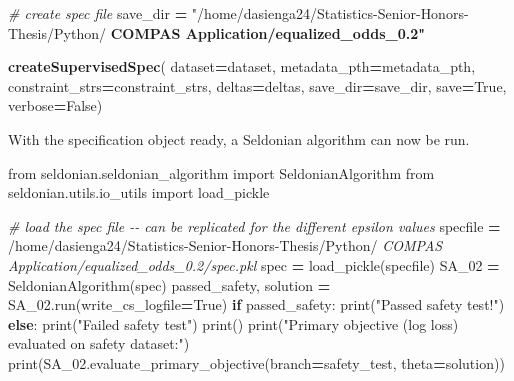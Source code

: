 \documentclass[12pt, twoside]{amherstthesis}
\newenvironment{Shaded}{\begin{snugshade}}{\end{snugshade}}
\newcommand{\BuiltInTok}[1]{#1}
\newcommand{\CommentTok}[1]{\textcolor[rgb]{0.56,0.35,0.01}{\textit{#1}}}
\newcommand{\ControlFlowTok}[1]{\textcolor[rgb]{0.13,0.29,0.53}{\textbf{#1}}}
\newcommand{\ErrorTok}[1]{\textcolor[rgb]{0.64,0.00,0.00}{\textbf{#1}}}
\newcommand{\ImportTok}[1]{#1}
\newcommand{\NormalTok}[1]{#1}
\newcommand{\OperatorTok}[1]{\textcolor[rgb]{0.81,0.36,0.00}{\textbf{#1}}}
\newcommand{\StringTok}[1]{\textcolor[rgb]{0.31,0.60,0.02}{#1}}
\newcommand{\VariableTok}[1]{\textcolor[rgb]{0.00,0.00,0.00}{#1}}
\begin{document}
\begin{Shaded}
\begin{Highlighting}[]
\CommentTok{\# create spec file}
\NormalTok{save\_dir }\OperatorTok{=} \StringTok{"/home/dasienga24/Statistics{-}Senior{-}Honors{-}Thesis/Python/\textquotesingle{}}
\ErrorTok{\textquotesingle{}COMPAS Application/equalized\_odds\_0.2"}

\ErrorTok{createSupervisedSpec}\NormalTok{(}
\NormalTok{            dataset}\OperatorTok{=}\NormalTok{dataset,}
\NormalTok{            metadata\_pth}\OperatorTok{=}\NormalTok{metadata\_pth,}
\NormalTok{            constraint\_strs}\OperatorTok{=}\NormalTok{constraint\_strs,}
\NormalTok{            deltas}\OperatorTok{=}\NormalTok{deltas,}
\NormalTok{            save\_dir}\OperatorTok{=}\NormalTok{save\_dir,}
\NormalTok{            save}\OperatorTok{=}\VariableTok{True}\NormalTok{,}
\NormalTok{            verbose}\OperatorTok{=}\VariableTok{False}\NormalTok{)}
\end{Highlighting}
\end{Shaded}
\noindent With the specification object ready, a Seldonian algorithm can now be run.
\begin{Shaded}
\begin{Highlighting}[]
\ImportTok{from}\NormalTok{ seldonian.seldonian\_algorithm }\ImportTok{import}\NormalTok{ SeldonianAlgorithm}
\ImportTok{from}\NormalTok{ seldonian.utils.io\_utils }\ImportTok{import}\NormalTok{ load\_pickle}

\CommentTok{\# load the spec file {-}{-} can be replicated for the different epsilon values}
\NormalTok{specfile }\OperatorTok{=} \StringTok{\textquotesingle{}/home/dasienga24/Statistics{-}Senior{-}Honors{-}Thesis/Python/\textquotesingle{}}
\CommentTok{\textquotesingle{}COMPAS Application/equalized\_odds\_0.2/spec.pkl\textquotesingle{}}
\NormalTok{spec }\OperatorTok{=}\NormalTok{ load\_pickle(specfile)}
\NormalTok{SA\_02 }\OperatorTok{=}\NormalTok{ SeldonianAlgorithm(spec)}
\NormalTok{passed\_safety, solution }\OperatorTok{=}\NormalTok{ SA\_02.run(write\_cs\_logfile}\OperatorTok{=}\VariableTok{True}\NormalTok{)}
\ControlFlowTok{if}\NormalTok{ passed\_safety:}
  \BuiltInTok{print}\NormalTok{(}\StringTok{"Passed safety test!"}\NormalTok{)}
\ControlFlowTok{else}\NormalTok{:}
  \BuiltInTok{print}\NormalTok{(}\StringTok{"Failed safety test"}\NormalTok{)}
\BuiltInTok{print}\NormalTok{()}
\BuiltInTok{print}\NormalTok{(}\StringTok{"Primary objective (log loss) evaluated on safety dataset:"}\NormalTok{)}
\BuiltInTok{print}\NormalTok{(SA\_02.evaluate\_primary\_objective(branch}\OperatorTok{=}\StringTok{\textquotesingle{}safety\_test\textquotesingle{}}\NormalTok{,}
\NormalTok{theta}\OperatorTok{=}\NormalTok{solution))}
\end{Highlighting}
\end{Shaded}
\end{document}
